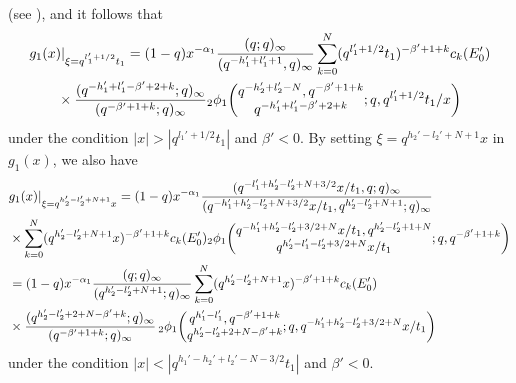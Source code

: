 \documentclass[12pt]{amsart}
\numberwithin{equation}{section}
\theoremstyle{definition}
\theoremstyle{remark}
\begin{document}
(see \cite{GR}), and it follows that
   \begin{align}
   &  g_1 (x) | _{\xi = q^{l_{1}' + 1/2}t_{1} } = (1 - q)x^{-\alpha_{1}}\frac{(q; q)_{\infty}}{(q^{-h_{1}' + l_{1}' + 1}, q)_{\infty}} \sum_{k = 0}^{N} (q^{l_{1}' + 1/2}t_{1})^{-\beta' + 1 + k} c_{k} (E'_0 ) \label{eq:1g11} \\
    &\qquad \times \frac{(q^{-h_{1}' + l_{1}' - \beta' + 2 + k}; q)_{\infty}}{(q^{-\beta' + 1 + k}; q)_{\infty}}
    {}_2\phi_1 \biggl( \begin{array}{@{}c@{}} q^{-h_{2}' + l_{2}' - N}, q^{-\beta' + 1 + k} \\
q^{-h_{1}' + l_{1}' - \beta' + 2 + k} \end{array} ;q,q^{l_{1}' + 1/2}t_{1}/x \biggr) \notag
  \end{align}
under the condition $ |x| > |q^{l_{1}' + 1/2}t_{1}|$ and $\beta '<0$.
By setting $\xi = q^{h_{2}' - l_{2}' + N + 1}x$ in $g_1 (x)$, we also have
  \begin{align}
 & g_1 (x) | _{\xi = q^{h_{2}' - l_{2}' + N + 1}x } = (1 - q)x^{-\alpha_{1}}\frac{(q^{-l_{1}' + h_{2}' - l_{2}' + N + 3/2}x/t_{1}, q; q)_{\infty}}{(q^{-h_{1}' + h_{2}' - l_{2}' + N + 3/2}x/t_{1}, q^{h_{2}' - l_{2}' + N + 1}; q)_{\infty}} \label{eq:1g12} \\
 &  \times \sum_{k = 0}^{N} (q^{h_{2}' - l_{2}' + N + 1}x)^{-\beta' + 1 + k} c_{k} (E'_0 ) {}_2\phi_1 \biggl( \begin{array}{@{}c@{}} q^{-h_{1}' + h_{2}' - l_{2}' + 3/2 + N}x/t_{1}, q^{h_{2}' - l_{2}' + 1  + N}  \\
q^{h_{2}' - l_{1}' - l_{2}' + 3/2 + N}x/t_{1} \end{array} ;q,q^{-\beta' + 1 + k} \biggr) \notag \\
    &= (1 - q)x^{-\alpha_{1}}\frac{(q; q)_{\infty}}{(q^{h_{2}' - l_{2}' + N + 1}; q)_{\infty}} \sum_{k = 0}^{N} (q^{h_{2}' - l_{2}' + N + 1}x)^{-\beta' + 1 + k} c_{k} (E'_0 )\notag \\
    & \times \frac{(q^{h_{2}' - l_{2}' + 2 + N - \beta' + k}; q)_{\infty}}{(q^{-\beta' + 1 + k}; q)_{\infty}} \, {}_2\phi_1 \biggl( \begin{array}{@{}c@{}} q^{h_{1}' - l_{1}'}, q^{-\beta' + 1 + k} \\
q^{h_{2}' - l_{2}' + 2 + N -\beta' + k} \end{array} ;q,q^{-h_{1}' + h_{2}' - l_{2}' + 3/2 + N}x/t_{1} \biggr) \notag
  \end{align}
under the condition $|x| < | q^{ h_{1}' - h_{2}' + l_{2}' - N - 3/2}t_{1}|  $ and $\beta '<0$.
\end{document}
